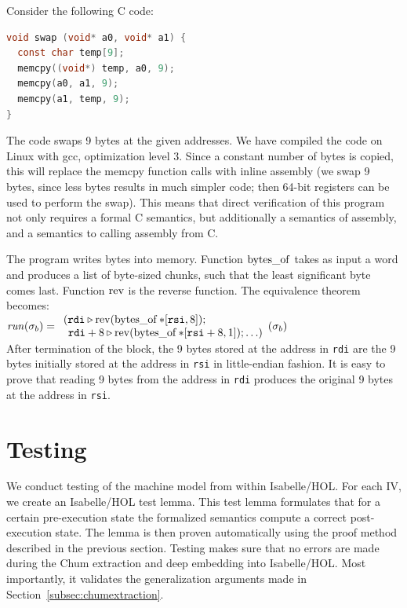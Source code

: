 Consider the following C code:
\begin{lstlisting}[language=C,style=customc]
void swap (void* a0, void* a1) {
  const char temp[9];
  memcpy((void*) temp, a0, 9);
  memcpy(a0, a1, 9);
  memcpy(a1, temp, 9);
}
\end{lstlisting}

The code swaps 9 bytes at the given addresses.
We have compiled the code on Linux with gcc, optimization level 3.
Since a constant number of bytes is copied, this will replace the memcpy function calls with inline assembly (we swap 9 bytes, since less bytes results in much simpler code; then 64-bit registers can be used to perform the swap).
This means that direct verification of this program not only requires a formal C semantics, but additionally a semantics of assembly, and a semantics to calling assembly from C.


The program writes bytes into memory.
Function $\operatorname{bytes\_of}$ takes as input a word and produces a list of byte-sized chunks, such that the least significant byte comes last.
Function $\operatorname{rev}$ is the reverse function.
The equivalence theorem becomes:
\\[1em]$
	\mbox{\hspace{0ex}} \mathit{run}(\sigma_b) = \begin{array}{l}
	    (\mathtt{rdi} \triangleright \operatorname{rev}(\operatorname{bytes\_of} \ast[\mathtt{rsi},8]) ; \\
	    \mbox{\hspace{1ex}}\mathtt{rdi} + 8 \triangleright \operatorname{rev}(\operatorname{bytes\_of} \ast[\mathtt{rsi} + 8, 1]) ; \ldots)
	   \end{array}
	  (\sigma_b)
$\\[1em]
After termination of the block, the 9 bytes stored at the address in \texttt{rdi} are the 9 bytes initially stored at the address in \texttt{rsi} in little-endian fashion.
It is easy to prove that reading 9 bytes from the address in \texttt{rdi} produces the original 9 bytes at the address in \texttt{rsi}.

\section{Testing}\label{sec:testing}

We conduct testing of the machine model from within Isabelle/HOL. 
For each IV, we create an Isabelle/HOL test lemma.
This test lemma formulates that for a certain pre-execution state the formalized semantics compute a correct post-execution state.
The lemma is then proven automatically using the proof method described in the previous section.
Testing makes sure that no errors are made during the Chum extraction and deep embedding into Isabelle/HOL.
Most importantly, it validates the generalization arguments made in Section~\ref{subsec:chumextraction}.

